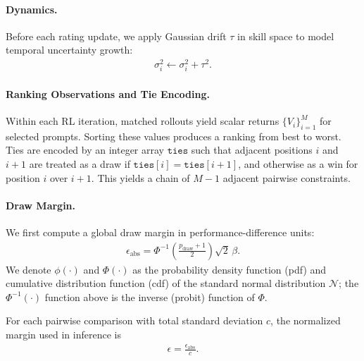 \documentclass{article}
\theoremstyle{plain}
\theoremstyle{definition}
\theoremstyle{remark}
\begin{document}
\paragraph{Dynamics.}
Before each rating update, we apply Gaussian drift $\tau$ in skill space to model temporal uncertainty growth:
\begin{align*}
\sigma_i^2 \leftarrow \sigma_i^2 + \tau^2 .
\end{align*}

\paragraph{Ranking Observations and Tie Encoding.}
Within each RL iteration, matched rollouts yield scalar returns $\{V_i\}_{i=1}^{M}$ for selected prompts. Sorting these values produces a ranking from best to worst. Ties are encoded by an integer array $\texttt{ties}$ such that adjacent positions $i$ and $i+1$ are treated as a draw if $\texttt{ties}[i]=\texttt{ties}[i+1]$, and otherwise as a win for position $i$ over $i+1$. This yields a chain of $M-1$ adjacent pairwise constraints.

\paragraph{Draw Margin.}
We first compute a global draw margin in performance-difference units:
\begin{align*}
\epsilon_{\mathrm{abs}}
= \Phi^{-1}\!\left(\frac{p_{\text{draw}}+1}{2}\right)\sqrt{2}\,\beta .
\end{align*}
We denote $\phi(\cdot)$ and $\Phi(\cdot)$ as the probability density function (pdf) and cumulative distribution function (cdf) of the standard normal distribution $\mathcal{N}$; the $\Phi^{-1}(\cdot)$ function above is the inverse (probit) function of $\Phi$.

For each pairwise comparison with total standard deviation $c$, the normalized margin used in inference is
\begin{align*}
\epsilon = \frac{\epsilon_{\mathrm{abs}}}{c}.
\end{align*}
\end{document}
